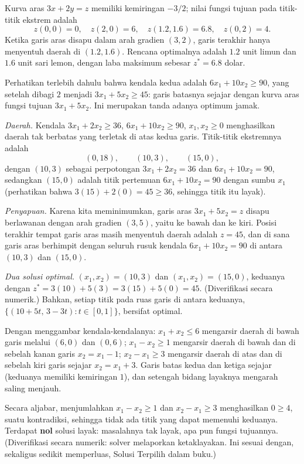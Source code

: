 Kurva aras $3x + 2y = z$ memiliki kemiringan $-3/2$; nilai fungsi tujuan pada titik-titik ekstrem adalah
\[
z(0,0) = 0, \quad z(2,0) = 6, \quad z(1.2,1.6) = 6.8, \quad z(0,2) = 4.
\]
Ketika garis aras disapu dalam arah gradien $(3,2)$, garis terakhir hanya menyentuh daerah di $(1.2, 1.6)$. Rencana optimalnya adalah $1.2$ unit limun dan $1.6$ unit sari lemon, dengan laba maksimum sebesar $z^* = 6.8$ dolar.

Perhatikan terlebih dahulu bahwa kendala kedua adalah $6x_1 + 10x_2 \geq 90$, yang setelah dibagi $2$ menjadi $3x_1 + 5x_2 \geq 45$: garis batasnya sejajar dengan kurva aras fungsi tujuan $3x_1 + 5x_2$. Ini merupakan tanda adanya optimum jamak.

\emph{Daerah.} Kendala $3x_1 + 2x_2 \geq 36$, $6x_1 + 10x_2 \geq 90$, $x_1, x_2 \geq 0$ menghasilkan daerah tak berbatas yang terletak di atas kedua garis. Titik-titik ekstremnya adalah
\[
(0,18), \qquad (10,3), \qquad (15,0),
\]
dengan $(10,3)$ sebagai perpotongan $3x_1+2x_2=36$ dan $6x_1+10x_2=90$, sedangkan $(15,0)$ adalah titik pertemuan $6x_1 + 10x_2 = 90$ dengan sumbu $x_1$ (perhatikan bahwa $3(15)+2(0) = 45 \geq 36$, sehingga titik itu layak).

\emph{Penyapuan.} Karena kita meminimumkan, garis aras $3x_1 + 5x_2 = z$ disapu berlawanan dengan arah gradien $(3,5)$, yaitu ke bawah dan ke kiri. Posisi terakhir tempat garis aras masih menyentuh daerah adalah $z = 45$, dan di sana garis aras berhimpit dengan seluruh rusuk kendala $6x_1 + 10x_2 = 90$ di antara $(10,3)$ dan $(15,0)$.

\emph{Dua solusi optimal.} $(x_1, x_2) = (10, 3)$ dan $(x_1, x_2) = (15, 0)$, keduanya dengan $z^* = 3(10) + 5(3) = 3(15) + 5(0) = 45$. (Diverifikasi secara numerik.) Bahkan, setiap titik pada ruas garis di antara keduanya, $\{(10 + 5t,\, 3 - 3t) : t \in [0,1]\}$, bersifat optimal.

Dengan menggambar kendala-kendalanya: $x_1 + x_2 \leq 6$ mengarsir daerah di bawah garis melalui $(6,0)$ dan $(0,6)$; $x_1 - x_2 \geq 1$ mengarsir daerah di bawah dan di sebelah kanan garis $x_2 = x_1 - 1$; $x_2 - x_1 \geq 3$ mengarsir daerah di atas dan di sebelah kiri garis sejajar $x_2 = x_1 + 3$. Garis batas kedua dan ketiga sejajar (keduanya memiliki kemiringan $1$), dan setengah bidang layaknya mengarah saling menjauh.

Secara aljabar, menjumlahkan $x_1 - x_2 \geq 1$ dan $x_2 - x_1 \geq 3$ menghasilkan $0 \geq 4$, suatu kontradiksi, sehingga tidak ada titik yang dapat memenuhi keduanya. Terdapat \textbf{nol} solusi layak: masalahnya tak layak, apa pun fungsi tujuannya. (Diverifikasi secara numerik: solver melaporkan ketaklayakan. Ini sesuai dengan, sekaligus sedikit memperluas, Solusi Terpilih dalam buku.)


